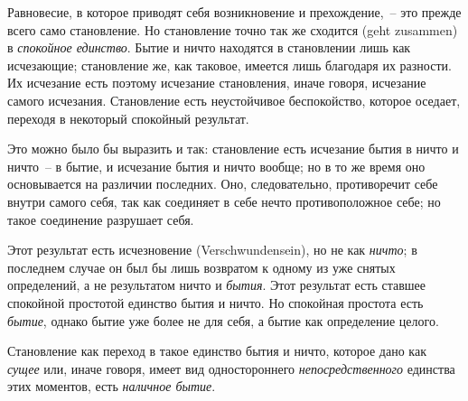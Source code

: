 Равновесие, в которое приводят себя возникновение
и прехождение,~-- это прежде всего само становление. Но
становление точно так же сходится (geht zusammen) в
\emph{спокойное единство}. Бытие и ничто находятся в становлении
лишь как исчезающие; становление же, как таковое,
имеется лишь благодаря их разности. Их исчезание
есть поэтому исчезание становления, иначе говоря, исчезание
самого исчезания. Становление есть неустойчивое
беспокойство, которое оседает, переходя в некоторый
спокойный результат.

Это можно было бы выразить и так: становление есть
исчезание бытия в ничто и ничто~-- в бытие, и исчезание
бытия и ничто вообще; но в то же время оно основывается
на различии последних. Оно, следовательно, противоречит
себе внутри самого себя, так как соединяет
в себе нечто противоположное себе; но такое соединение
разрушает себя.

Этот результат есть исчезновение (Verschwundensein),
но не как \emph{ничто}; в последнем случае он был бы лишь возвратом
к одному из уже снятых определений, а не результатом
ничто и \emph{бытия}. Этот результат есть ставшее
спокойной простотой единство бытия и ничто. Но спокойная
простота есть \emph{бытие}, однако бытие уже более не для
себя, а бытие как определение целого.

Становление как переход в такое единство бытия и
ничто, которое дано как \emph{сущее} или, иначе говоря, имеет
вид одностороннего \emph{непосредственного} единства этих моментов,
есть \emph{наличное бытие}.


